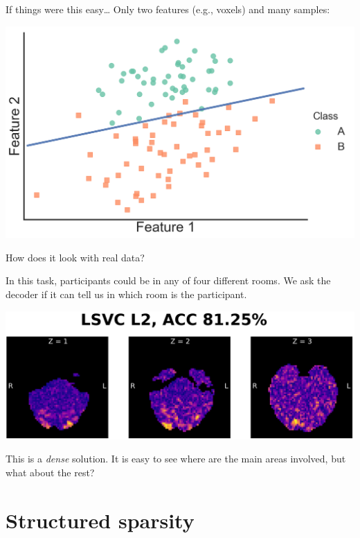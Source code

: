 \documentclass[11pt]{beamer}
\begin{document}
\begin{frame}{If things were this easy\ldots}
    Only two features (e.g., voxels) and many samples:

    \begin{center}
        \includegraphics[scale=0.3]{figures/grad_descent_result.png}        
    \end{center}
\end{frame}

\begin{frame}{How does it look with real data?}

    In this task, participants could be in any of four different rooms. We ask
    the decoder if it can tell us in which room is the participant.

    \begin{center}
        \includegraphics[scale=0.7]{figures/lsvc_l2-axial.png}
    \end{center}

    This is a \emph{dense} solution. It is easy to see where are the main areas
    involved, but what about the rest?

\end{frame}

\section{Structured sparsity}
\label{sec:Structured sparsity}
\end{document}
